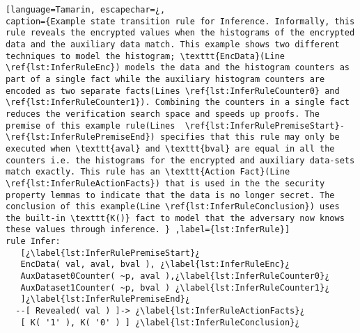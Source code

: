 \begin{lstlisting}[language=Tamarin, escapechar=¿, 
caption={Example state transition rule for Inference. Informally, this rule reveals the encrypted values when the histograms of the encrypted data and the auxiliary data match. This example shows two different techniques to model the histogram; \texttt{EncData}(Line \ref{lst:InferRuleEnc}) models the data and the histogram counters as part of a single fact while the auxiliary histogram counters are encoded as two separate facts(Lines \ref{lst:InferRuleCounter0} and \ref{lst:InferRuleCounter1}). Combining the counters in a single fact reduces the verification search space and speeds up proofs. The premise of this example rule(Lines  \ref{lst:InferRulePremiseStart}-\ref{lst:InferRulePremiseEnd}) specifies that this rule may only be executed when \texttt{aval} and \texttt{bval} are equal in all the counters i.e. the histograms for the encrypted and auxiliary data-sets match exactly. This rule has an \texttt{Action Fact}(Line \ref{lst:InferRuleActionFacts}) that is used in the the security property lemmas to indicate that the data is no longer secret. The conclusion of this example(Line \ref{lst:InferRuleConclusion}) uses the built-in \texttt{K()} fact to model that the adversary now knows these values through inference. } ,label={lst:InferRule}]
rule Infer:
   [¿\label{lst:InferRulePremiseStart}¿
   EncData( val, aval, bval ), ¿\label{lst:InferRuleEnc}¿
   AuxDataset0Counter( ~p, aval ),¿\label{lst:InferRuleCounter0}¿
   AuxDataset1Counter( ~p, bval ) ¿\label{lst:InferRuleCounter1}¿
   ]¿\label{lst:InferRulePremiseEnd}¿ 
  --[ Revealed( val ) ]-> ¿\label{lst:InferRuleActionFacts}¿
   [ K( '1' ), K( '0' ) ] ¿\label{lst:InferRuleConclusion}¿

\end{lstlisting}

